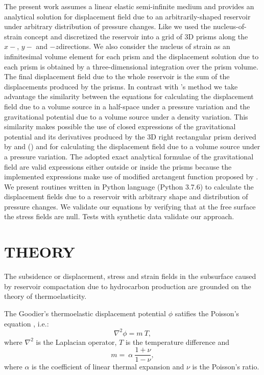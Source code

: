 \documentclass[journal abbreviation, manuscript]{copernicus}
\begin{document}
The present work assumes a linear elastic semi-infinite medium and provides an analytical solution for displacement field due to an arbitrarily-shaped reservoir under arbitrary distribution of pressure changes. 
Like \cite{Munoz&Roehl17} we used the nucleus-of-strain concept and discretized the
reservoir into a grid of 3D prisms along the $x-$, $y-$ and $-z$directions.
We also consider the nucleus of strain as an infinitesimal volume element  for each prism and the displacement solution due to each prism is obtained by a three-dimensional integration over the prism volume. 
The final displacement field due to the whole reservoir is the sum of the displacements produced by the prisms. 
In contrast with \cite{Munoz&Roehl17}'s method we take advantage the similarity between 
the  equations for calculating the displacement field due to a volume source in a half-space under a pressure variation and the gravitational potential due to a volume source under a density variation.
This similarity makes possible the use of closed expressions of the gravitational potential and its derivatives produced by the 3D right rectangular prism derived by \cite{Nagyetal2000} and (\citeyear{Nagyetal2002}) and \cite{Fukushima2020}  for calculating the displacement field due to a volume source under a pressure variation.
The adopted exact analytical formulae of the gravitational field  are valid expressions either outside or inside the prisms because the implemented expressions make use of  modified arctangent function proposed by \cite{Fukushima2020}. 
We present routines written in Python language (Python 3.7.6)  to calculate the displacement fields due to a reservoir with arbitrary shape and distribution of pressure changes. 
We validate our equations by verifying that at the free surface the stress fields are null.
Tests with synthetic data validate our approach. 

\section{THEORY}

The subsidence or displacement, stress and strain fields in the subsurface caused by reservoir compactation due to hydrocarbon production are grounded on the theory of thermoelasticity. 

The Goodier’s thermoelastic displacement potential $\phi$ satifies the Poisson's equation \citep{Goodier37}, i.e.:
\begin{equation}
\nabla^{2} \phi =  m \: T,
\label{eq:poisson}
\end{equation}
where $\nabla^{2}$ is the Laplacian operator, $T $ is the temperature difference and 
\begin{equation}
m =  \:  \alpha \: \frac{1 + \nu}{ 1 -\nu},
\label{eq:m}
\end{equation}
where $\alpha$  is the coefficient of linear thermal expansion and $\nu$ is the Poisson's ratio.
\end{document}
